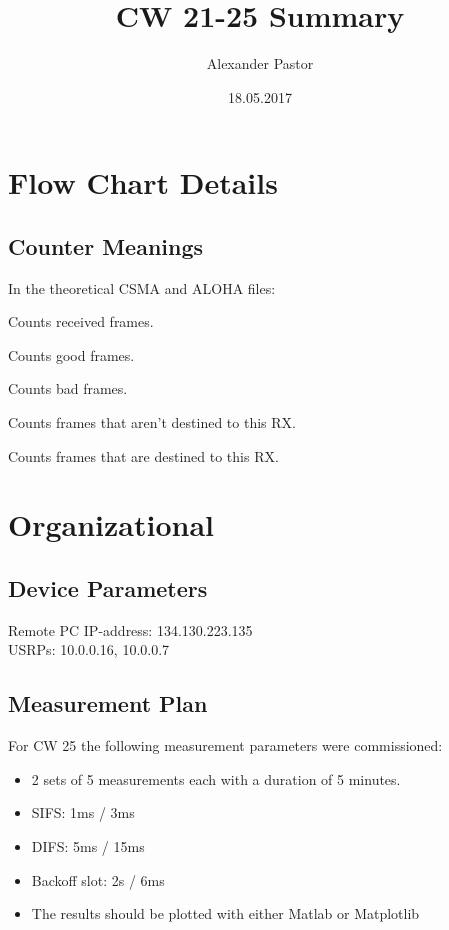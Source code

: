 \documentclass{article}
\begin{document}
	
\title{CW 21-25 Summary}
\author{Alexander Pastor}
\date{18.05.2017}
\maketitle
\tableofcontents
\newpage

\section{Flow Chart Details}
\subsection{Counter Meanings}

In the theoretical CSMA and ALOHA files:
\begin{description}[leftmargin=!]
	\item[Counter 1:] Counts received frames.
	\item[Counter 2:] Counts good frames.
	\item[Counter 3:] Counts bad frames.
	\item[Counter 4:] Counts frames that aren't destined to this RX.
	\item[Counter 5:] Counts frames that are destined to this RX.
\end{description}

\section{Organizational}

\subsection{Device Parameters}

Remote PC IP-address: 134.130.223.135 \\
USRPs: 10.0.0.16, 10.0.0.7

\subsection{Measurement Plan}

For CW 25 the following measurement parameters were commissioned:

\begin{itemize}
	\item 2 sets of 5 measurements each with a duration of 5 minutes.
	\item SIFS: 1ms / 3ms 
	\item DIFS: 5ms  / 15ms 
	\item Backoff slot: 2s / 6ms
	\item The results should be plotted with either Matlab or Matplotlib
\end{itemize}
\end{document}
